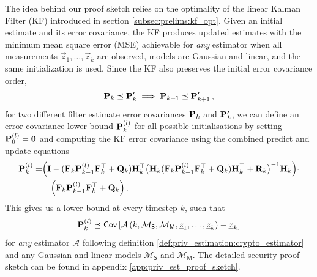 The idea behind our proof sketch relies on the optimality of the linear Kalman Filter (KF) introduced in section \ref{subsec:prelims:kf_opt}. Given an initial estimate and its error covariance, the KF produces updated estimates with the minimum mean square error (MSE) achievable for \textit{any} estimator when all measurements $\vec{z}_1,\dots,\vec{z}_k$ are observed, models are Gaussian and linear, and the same initialization is used. Since the KF also preserves the initial error covariance order,
\begin{equation}
   {\ensuremath{{\mathbf{P}}}}_k \preceq {\ensuremath{{\mathbf{P}}}}_k^\prime \implies {\ensuremath{{\mathbf{P}}}}_{k+1} \preceq {\ensuremath{{\mathbf{P}}}}_{k+1}^\prime\,,
\end{equation}
for two different filter estimate error covariances ${{\mathbf{P}}}_k$ and ${{\mathbf{P}}}_k^\prime$, we can define an error covariance lower-bound ${{\mathbf{P}}}_k^{(l)}$ for all possible initialisations by setting ${{\mathbf{P}}}_0^{(l)} = {{\mathbf{0}}}$ and computing the KF error covariance using the combined predict and update equations
\begin{equation}\label{eq:priv_estimation:est_lower_bound_error_cov}
   \begin{split}
      {\ensuremath{{\mathbf{P}}}}_k^{(l)} =& \Bigl( {{\mathbf{I}}} - ({{\mathbf{F}}}_k{{\mathbf{P}}}_{k-1}^{(l)}{{\mathbf{F}}}_k^\top + {{\mathbf{Q}}}_k){{\mathbf{H}}}_k^\top \bigl({{\mathbf{H}}}_k({{\mathbf{F}}}_k{{\mathbf{P}}}_{k-1}^{(l)}{{\mathbf{F}}}_k^\top + {{\mathbf{Q}}}_k){{\mathbf{H}}}_k^\top + {{\mathbf{R}}}_k\bigr)^{-1}{{\mathbf{H}}}_k\Bigr)\cdot\\
      &\quad\Bigl({{\mathbf{F}}}_k{{\mathbf{P}}}_{k-1}^{(l)}{{\mathbf{F}}}_k^\top + {{\mathbf{Q}}}_k\Bigr)\,.
   \end{split}
\end{equation}
This gives us a lower bound at every timestep $k$, such that
\begin{equation}
   {\ensuremath{{\mathbf{P}}}}_k^{(l)} \preceq \mathsf{Cov}\left[\mathcal{A}\left(k, \mathcal{M}_{\mathsf{S}}, \mathcal{M}_{\mathsf{M}}, {\underline{z}}_1,\dots,{\underline{z}}_k\right) - {\underline{x}}_k \right]
\end{equation}
for \textit{any} estimator $\mathcal{A}$ following definition \ref{def:priv_estimation:crypto_estimator} and any Gaussian and linear models $\mathcal{M}_{\mathsf{S}}$ and $\mathcal{M}_{\mathsf{M}}$. The detailed security proof sketch can be found in appendix \ref{app:priv_est_proof_sketch}.

